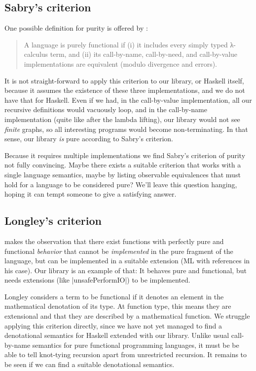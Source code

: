 \documentclass[manuscript,screen,acmsmall,nonacm]{acmart}
\begin{document}
\subsection{Sabry's criterion}

One possible definition for purity is offered by \citet{sabry}:
\begin{quote}
A language is purely functional if (i) it includes every simply typed λ-calculus term, and
(ii) its call-by-name, call-by-need, and call-by-value implementations are equivalent (modulo
divergence and errors).
\end{quote}

It is not straight-forward to apply this criterion to our library, or Haskell itself, because it assumes the existence of these three implementations, and we do not have that for Haskell. Even if we had, in the call-by-value implementation, all our recursive definitions would vacuously loop, and in the call-by-name implementation (quite like after the lambda lifting), our library would not see \emph{finite} graphs, so all interesting programs would become non-terminating. In that sense, our library \emph{is} pure according to Sabry’s criterion.

Because it requires multiple implementations we find Sabry’s criterion of purity not fully convincing. Maybe there exists a suitable criterion that works with a single language semantics, maybe by listing observable equivalences that must hold for a language to be considered pure?
We'll leave this question hanging, hoping it can tempt someone to give a satisfying answer.

\subsection{Longley’s criterion}

 makes the observation that there exist functions with perfectly pure and functional \emph{behavior} that cannot be \emph{implemented} in the pure fragment of the language, but can be implemented in a suitable extension (ML with references in his case). Our library is an example of that: It behaves pure and functional, but needs extensions (like |unsafePerformIO|) to be implemented.

Longley considers a term to be functional if it denotes an element in the mathematical denotation of its type. At function type, this means they are extensional and that they are described by a mathematical function. We struggle applying this criterion directly, since we have not yet managed to find a denotational semantics for Haskell extended with our library. Unlike usual call-by-name semantics for pure functional programming languages, it must be be able to tell knot-tying recursion apart from unrestricted recursion. It remains to be seen if we can find a suitable denotational semantics.

\fi
\end{document}
